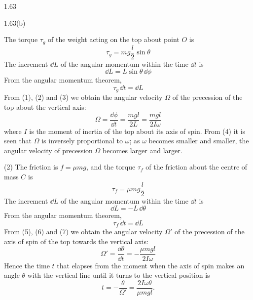 \begin{solution}{1.63}
\begin{figbox}{1.63(b)}
\end{figbox}

The torque $\tau_g$ of the weight acting on the top about point $O$ is
\begin{equation}
\tau_g=mg\frac{l}{2}\sin\theta \tag{1}
\end{equation}
The increment $\dd L$ of the angular momentum within the time $\dd t$ is
\begin{equation}
\dd L=L\sin\theta\,\dd\phi \tag{2}
\end{equation}
From the angular momentum theorem,
\begin{equation}
\tau_g\,\dd t=\dd L \tag{3}
\end{equation}
From (1), (2) and (3) we obtain the angular velocity $\Omega$ of the precession of the top about the vertical axis:
\begin{equation}
\Omega=\frac{\dd\phi}{\dd t}=\frac{mgl}{2L}=\frac{mgl}{2I\omega} \tag{4}
\end{equation}
where $I$ is the moment of inertia of the top about its axis of spin. From (4) it is seen that $\Omega$ is inversely proportional to $\omega$; as $\omega$ becomes smaller and smaller, the angular velocity of precession $\Omega$ becomes larger and larger.

(2) The friction is $f=\mu mg$, and the torque $\tau_f$ of the friction about the centre of mass $C$ is
\begin{equation}
\tau_f=\mu mg\frac{l}{2} \tag{5}
\end{equation}
The increment $\dd L$ of the angular momentum within the time $\dd t$ is
\begin{equation}
\dd L=-L\,\dd\theta \tag{6}
\end{equation}
From the angular momentum theorem,
\begin{equation}
\tau_f\,\dd t=\dd L \tag{7}
\end{equation}
From (5), (6) and (7) we obtain the angular velocity $\Omega'$ of the precession of the axis of spin of the top towards the vertical axis:
\begin{equation}
\Omega'=\frac{\dd\theta}{\dd t}=-\frac{\mu mgl}{2I\omega} \tag{8}
\end{equation}
Hence the time $t$ that elapses from the moment when the axis of spin makes an angle $\theta$ with the vertical line until it turns to the vertical position is
\[
t=-\frac{\theta}{\Omega'}=\frac{2I\omega\theta}{\mu mgl}.
\]

\end{solution}

